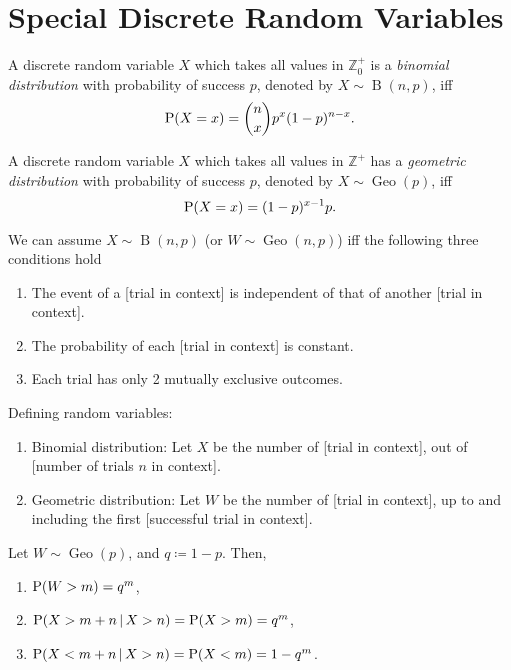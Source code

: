 \documentclass[oneside]{book}
\begin{document}
\chapter{Special Discrete Random Variables}
\begin{definition}{}{}
  A discrete random variable \(X\) which takes all values in \(\mathbb{Z}^{+}_{0}\) is a \emph{binomial distribution} with probability of success \(p\), denoted by \(X \sim \operatorname{B}(n,p)\), iff
  \[\operatorname{P}(X=x)=\binom{n}{x}p^x(1-p)^{n-x}.\]
\end{definition}
\begin{definition}{}{}
  A discrete random variable \(X\) which takes all values in \(\mathbb{Z}^{+}\) has a \emph{geometric distribution} with probability of success \(p\), denoted by \(X \sim \operatorname{Geo}(p)\), iff
  \[\operatorname{P}(X=x)=(1-p)^{x-1}p.\]
\end{definition}
\begin{note}
  We can assume \(X \sim \operatorname{B}(n,p)\) (or \(W \sim \operatorname{Geo}(n,p)\)) iff the following three conditions hold
  \begin{enumerate}
    \item The event of a [trial in context] is independent of that of another [trial in context].
    \item The probability of each [trial in context] is constant.
    \item Each trial has only 2 mutually exclusive outcomes.
  \end{enumerate}
\end{note}
\begin{note}
  Defining random variables:
  \begin{enumerate}
    \item Binomial distribution: Let \(X\) be the number of [trial in context], out of [number of trials \(n\) in context]. 
    \item Geometric distribution: Let \(W\) be the number of [trial in context], up to and including the first [successful trial in context].
  \end{enumerate}
\end{note}
\begin{note}
  Let \(W \sim \operatorname{Geo}(p)\), and \(q\coloneq 1-p\). Then,
  \begin{enumerate}
    \item \(\operatorname{P}(W>m)=q^m\),
    \item \(\operatorname{P}(X>m+n \,\vert\, X>n)=\operatorname{P}(X>m)=q^m\),\item \(\operatorname{P}(X<m+n \,\vert\, X>n)=\operatorname{P}(X<m)=1-q^m\).
  \end{enumerate}
\end{note}
\end{document}
